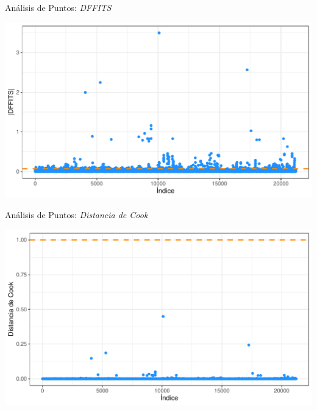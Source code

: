 \documentclass[11pt]{beamer}\usepackage{knitr}
\begin{document}
\begin{frame}[fragile]{Análisis de Puntos: \textit{DFFITS}}

\begin{knitrout}\footnotesize
{}\color{fgcolor}

{\centering \includegraphics[width=\maxwidth]{figure/unnamed-chunk-6-1} 

}



\end{knitrout}


\end{frame}


\begin{frame}[fragile]{Análisis de Puntos: \textit{Distancia de Cook}}

\begin{knitrout}\footnotesize
{}\color{fgcolor}

{\centering \includegraphics[width=\maxwidth]{figure/unnamed-chunk-7-1} 

}



\end{knitrout}


\end{frame}
\end{document}
